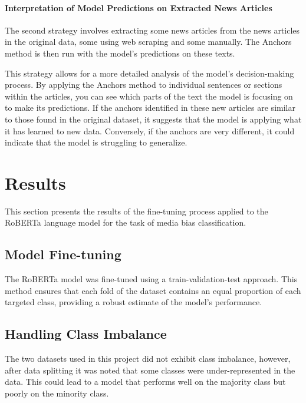 \documentclass[11pt,a4paper]{article}
\begin{document}
\paragraph{Interpretation of Model Predictions on Extracted News Articles}
The second strategy involves extracting some news articles from the news articles in the original data, some using web scraping and some manually. The Anchors method is then run with the model’s predictions on these texts. 

This strategy allows for a more detailed analysis of the model’s decision-making process. By applying the Anchors method to individual sentences or sections within the articles, you can see which parts of the text the model is focusing on to make its predictions.
If the anchors identified in these new articles are similar to those found in the original dataset, it suggests that the model is applying what it has learned to new data. Conversely, if the anchors are very different, it could indicate that the model is struggling to generalize.
\section{Results}
This section presents the results of the fine-tuning process applied to the RoBERTa language model for the task of media bias classification.
\subsection{Model Fine-tuning}
The RoBERTa model was fine-tuned using a train-validation-test approach. This method ensures that each fold of the dataset contains an equal proportion of each targeted class, providing a robust estimate of the model’s performance.
\subsection{Handling Class Imbalance}
The two datasets used in this project did not exhibit class imbalance, however, after data splitting it was noted that some classes were under-represented in the data. This could lead to a model that performs well on the majority class but poorly on the minority class.
\end{document}
